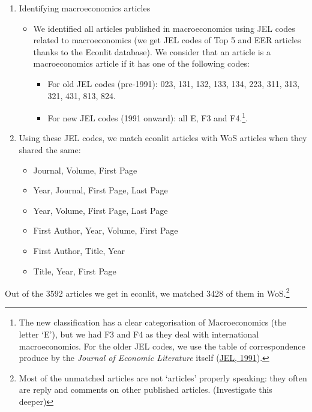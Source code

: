\documentclass[]{elsarticle} %
\providecommand{\tightlist}{%
  \setlength{\itemsep}{0pt}\setlength{\parskip}{0pt}}
\begin{document}
\begin{enumerate}
\def\labelenumi{\arabic{enumi}.}
\item
  Identifying macroeconomics articles

  \begin{itemize}
  \item
    We identified all articles published in macroeconomics using JEL
    codes related to macroeconomics (we get JEL codes of Top 5 and EER
    articles thanks to the Econlit database). We consider that an
    article is a macroeconomics article if it has one of the following
    codes:

    \begin{itemize}
    \tightlist
    \item
      For old JEL codes (pre-1991): 023, 131, 132, 133, 134, 223, 311,
      313, 321, 431, 813, 824.
    \item
      For new JEL codes (1991 onward): all E, F3 and F4.\footnote{The
        new classification has a clear categorisation of Macroeconomics
        (the letter `E'), but we had F3 and F4 as they deal with
        international macroeconomics. For the older JEL codes, we use
        the table of correspondence produce by the \emph{Journal of
        Economic Literature} itself
        (\protect\hyperlink{ref-jel1991}{JEL, 1991}).}.
    \end{itemize}
  \end{itemize}
\item
  Using these JEL codes, we match econlit articles with WoS articles
  when they shared the same:

  \begin{itemize}
  \tightlist
  \item
    Journal, Volume, First Page
  \item
    Year, Journal, First Page, Last Page
  \item
    Year, Volume, First Page, Last Page
  \item
    First Author, Year, Volume, First Page
  \item
    First Author, Title, Year
  \item
    Title, Year, First Page
  \end{itemize}
\end{enumerate}

Out of the 3592 articles we get in econlit, we matched 3428 of them in
WoS.\footnote{Most of the unmatched articles are not `articles' properly
  speaking: they often are reply and comments on other published
  articles. (Investigate this deeper)}
\end{document}

